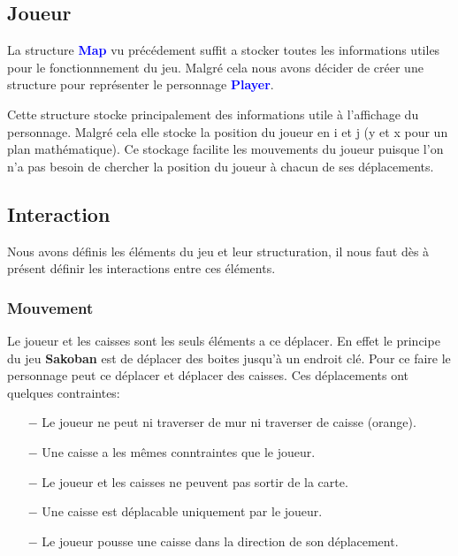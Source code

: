 \documentclass[french, 12pt]{article}
\begin{document}
    \subsection{Joueur}
        La structure \textcolor{blue}{\textbf{Map}} vu précédement suffit a stocker toutes les informations utiles pour le fonctionnnement du jeu. Malgré cela nous avons décider de créer une structure pour représenter le personnage \textcolor{blue}{\textbf{Player}}.

        Cette structure stocke principalement des informations utile à l'affichage du personnage. Malgré cela elle stocke la position du joueur en i et j (y et x pour un plan mathématique). Ce stockage facilite les mouvements du joueur puisque l'on n'a pas besoin de chercher la position du joueur à chacun de ses déplacements.

    \subsection{Interaction}
        Nous avons définis les éléments du jeu et leur structuration, il nous faut dès à présent définir les interactions entre ces éléments.

        \subsubsection{Mouvement}
        Le joueur et les caisses sont les seuls éléments a ce déplacer. En effet le principe du jeu \textbf{Sakoban} est de déplacer des boites jusqu'à un endroit clé. Pour ce faire le personnage peut ce déplacer et déplacer des caisses. Ces déplacements ont quelques contraintes:

        \begin{itemize}
            \item[$-$] Le joueur ne peut ni traverser de mur ni traverser de caisse (orange).
            \item[$-$] Une caisse a les mêmes conntraintes que le joueur.
            \item[$-$] Le joueur et les caisses ne peuvent pas sortir de la carte.
            \item[$-$] Une caisse est déplacable uniquement par le joueur.
            \item[$-$] Le joueur pousse une caisse dans la direction de son déplacement.
        \end{itemize}
\end{document}

